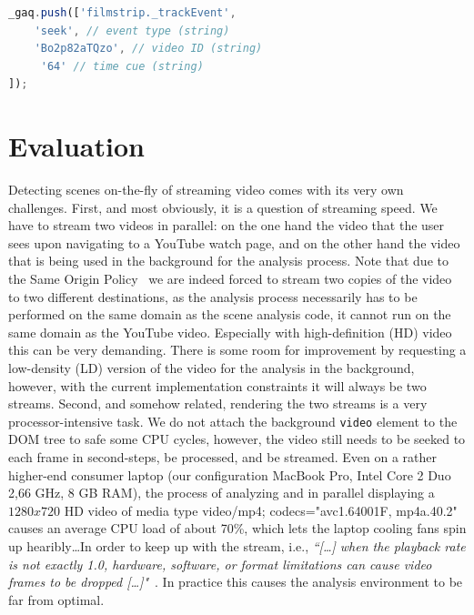\documentclass[10pt,twocolumn,letterpaper]{article}
\begin{document}
\begin{lstlisting}[caption=JavaScript hot spot event tracking code snippet. The \texttt{\_gaq} object refers to the Analytics event tracking queue., label=code:event, float=t, frame=single, language=JavaScript]
_gaq.push(['filmstrip._trackEvent', 
    'seek', // event type (string)
    'Bo2p82aTQzo', // video ID (string)
     '64' // time cue (string)
]);
\end{lstlisting} 

\section{Evaluation} \label{sec:evaluation}
Detecting scenes on-the-fly of streaming video comes with its very own challenges. First, and most obviously, it is a question of streaming speed. We have to stream two videos in parallel: on the one hand the video that the user sees upon navigating to a YouTube watch page, and on the other hand the video that is being used in the background for the analysis process. Note that due to the Same Origin Policy~\cite{sameoriginpolicy} we are indeed forced to stream two copies of the video to two different destinations, as the analysis process necessarily has to be performed on the same domain as the scene analysis code, it cannot run on the same domain as the YouTube video. Especially with high-definition (HD) video this can be very demanding. There is some room for improvement by requesting a low-density (LD) version of the video for the analysis in the background, however, with the current implementation constraints it will always be two streams. Second, and somehow related, rendering the two streams is a very processor-intensive task. We do not attach the background \texttt{video} element to the DOM tree to safe some CPU cycles, however, the video still needs to be seeked to each frame in second-steps, be processed, and be streamed. Even on a rather higher-end consumer laptop (our configuration MacBook Pro, Intel Core 2 Duo 2,66 GHz, 8 GB RAM), the process of analyzing and in parallel displaying a $1280x720$ HD video of media type video/mp4; codecs="avc1.64001F, mp4a.40.2" causes an average CPU load of about 70\%, which lets the laptop cooling fans spin up hearibly\ldots In order to keep up with the stream, i.e., \textit{``[\ldots] when the playback rate is not exactly 1.0, hardware, software, or format limitations can cause video frames to be dropped [\ldots]"}~\cite{whatwgvideo}. In practice this causes the analysis environment to be far from optimal.
\end{document}
